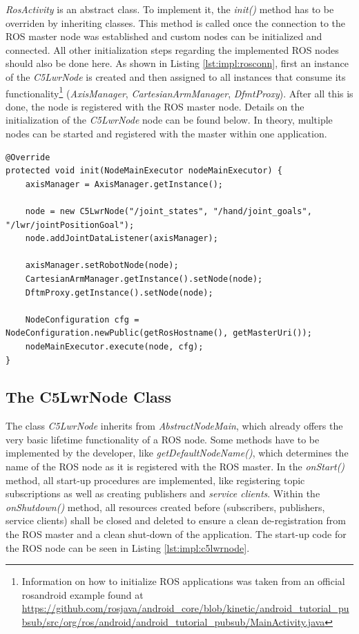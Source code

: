 \textit{RosActivity} is an abstract class. To implement it, the \textit{init()} method has to be overriden by inheriting classes. This method is called once the connection to the ROS master node was established and custom nodes can be initialized and connected. All other initialization steps regarding the implemented ROS nodes should also be done here. As shown in Listing \ref{lst:impl:rosconn}, first an instance of the \textit{C5LwrNode} is created and then assigned to all instances that consume its functionality\footnote{Information on how to initialize ROS applications was taken from an official rosandroid example found at \url{https://github.com/rosjava/android_core/blob/kinetic/android_tutorial_pubsub/src/org/ros/android/android_tutorial_pubsub/MainActivity.java}} (\textit{AxisManager}, \textit{CartesianArmManager}, \textit{DfmtProxy}). After all this is done, the node is registered with the ROS master node. Details on the initialization of the \textit{C5LwrNode} node can be found below. In theory, multiple nodes can be started and registered with the master within one application.

\begin{lstlisting}[caption={Initialization of the ROS connection}, label={lst:impl:rosconn}]
@Override
protected void init(NodeMainExecutor nodeMainExecutor) {
	axisManager = AxisManager.getInstance();
	
	node = new C5LwrNode("/joint_states", "/hand/joint_goals", "/lwr/jointPositionGoal");
	node.addJointDataListener(axisManager);
	
	axisManager.setRobotNode(node);
	CartesianArmManager.getInstance().setNode(node);
	DftmProxy.getInstance().setNode(node);

	NodeConfiguration cfg = NodeConfiguration.newPublic(getRosHostname(), getMasterUri());
	nodeMainExecutor.execute(node, cfg);
}
\end{lstlisting}

\subsection{The C5LwrNode Class}

The class \textit{C5LwrNode} inherits from \textit{AbstractNodeMain}, which already offers the very basic lifetime functionality of a ROS node. Some methods have to be implemented by the developer, like \textit{getDefaultNodeName()}, which determines the name of the ROS node as it is registered with the ROS master. In the \textit{onStart()} method, all start-up procedures are implemented, like registering topic subscriptions as well as creating publishers and \textit{service clients}. Within the \textit{onShutdown()} method, all resources created before (subscribers, publishers, service clients) shall be closed and deleted to ensure a clean de-registration from the ROS master and a clean shut-down of the application. The start-up code for the ROS node can be seen in Listing \ref{lst:impl:c5lwrnode}.

